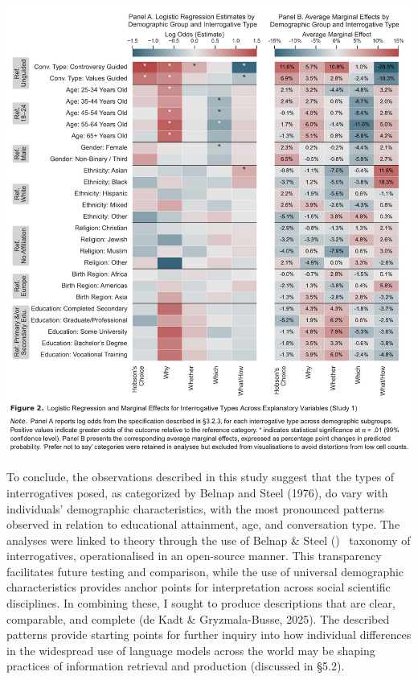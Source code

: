 \documentclass[
  12pt,
]{article}
\begin{document}
\begin{center}\includegraphics{../03_outputs/02_descriptive_analyses/figure_2} \end{center}

To conclude, the observations described in this study suggest that the types of interrogatives posed, as categorized by Belnap and Steel (1976), do vary with individuals' demographic characteristics, with the most pronounced patterns observed in relation to educational attainment, age, and conversation type. The analyses were linked to theory through the use of Belnap \& Steel () ~taxonomy of interrogatives, operationalised in an open-source manner. This transparency facilitates future testing and comparison, while the use of universal demographic characteristics provides anchor points for interpretation across social scientific disciplines. In combining these, I sought to produce descriptions that are clear, comparable, and complete (de Kadt \& Gryzmala-Busse, 2025). The described patterns provide starting points for further inquiry into how individual differences in the widespread use of language models across the world may be shaping practices of information retrieval and production (discussed in §5.2).
\end{document}
